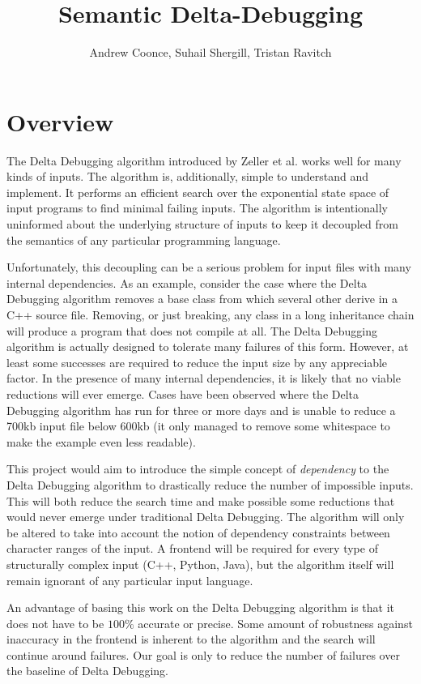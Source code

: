 \documentclass[11pt]{article}
\title{Semantic Delta-Debugging}
\author{
Andrew Coonce, Suhail Shergill, Tristan Ravitch\\
\email{\{coonce, shergill, travitch\}@cs.wisc.edu}
}
\begin{document}
\maketitle

\section{Overview}
The Delta Debugging algorithm introduced by Zeller et al. \cite{dd} works well
for many kinds of inputs. The algorithm is, additionally, simple to understand
and implement. It performs an efficient search over the exponential state space
of input programs to find minimal failing inputs. The algorithm is intentionally
uninformed about the underlying structure of inputs to keep it decoupled from
the semantics of any particular programming language.

Unfortunately, this decoupling can be a serious problem for input files with
many internal dependencies. As an example, consider the case where the Delta
Debugging algorithm removes a base class from which several other derive in a
C++ source file. Removing, or just breaking, any class in a long inheritance
chain will produce a program that does not compile at all. The Delta Debugging
algorithm is actually designed to tolerate many failures of this form. However,
at least some successes are required to reduce the input size by any appreciable
factor. In the presence of many internal dependencies, it is likely that no
viable reductions will ever emerge. Cases have been observed where the Delta
Debugging algorithm has run for three or more days and is unable to reduce a
700kb input file below 600kb (it only managed to remove some whitespace to make
the example even less readable).

This project would aim to introduce the simple concept of \emph{dependency} to the
Delta Debugging algorithm to drastically reduce the number of impossible
inputs. This will both reduce the search time and make possible some reductions
that would never emerge under traditional Delta Debugging. The algorithm will
only be altered to take into account the notion of dependency constraints
between character ranges of the input. A frontend will be required for every
type of structurally complex input (C++, Python, Java), but the algorithm itself
will remain ignorant of any particular input language.

An advantage of basing this work on the Delta Debugging algorithm is that it
does not have to be $100 \%$ accurate or precise. Some amount of robustness
against inaccuracy in the frontend is inherent to the algorithm and the search
will continue around failures. Our goal is only to reduce the number of failures
over the baseline of Delta Debugging.
\end{document}

